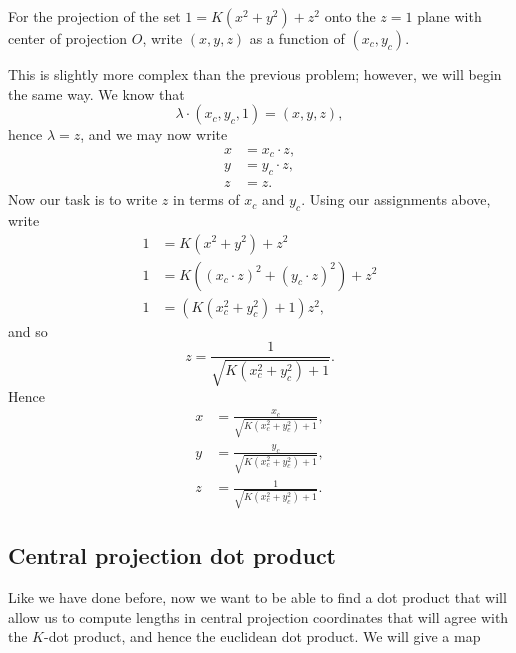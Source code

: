 \documentclass[newpage,hints,handout,12pt,noauthor,nooutcomes]{ximera}
\begin{document}
\begin{problem}
  For the projection of the set $1=K\left(x^{2}+y^{2}\right)+z^{2} $
  onto the $z=1$ plane with center of projection $O$, write $(x,y,z)$
  as a function of $(x_{c},y_{c})$.
  \begin{freeResponse}
    This is slightly more complex than the previous problem; however,
    we will begin the same way. We know that
    \[
    \lambda\cdot(x_{c},y_{c},1)=(x,y,z),
    \]
    hence $\lambda=z$, and we may now write
    \begin{align*}
      x &= x_c\cdot z,\\
      y &= y_c\cdot z,\\
      z &= z.
    \end{align*}
    Now our task is to write $z$ in terms of $x_c$ and $y_c$. Using our assignments above, write
    \begin{align*}
      1 &= K\left(x^2 + y^2\right) + z^2\\
      1 &= K\left((x_c\cdot z)^2 + (y_c\cdot z)^2\right) + z^2\\
      1 &= \left(K\left(x_c^2 + y_c^2\right)+1\right)z^2,
    \end{align*}
    and so
    \[
    z = \frac{1}{\sqrt{K\left(x_c^2 + y_c^2\right)+1}}.
    \]
    Hence
    \begin{align*}
      x &= \frac{x_c}{\sqrt{K\left(x_c^2 + y_c^2\right)+1}},\\
      y &= \frac{y_c}{\sqrt{K\left(x_c^2 + y_c^2\right)+1}},\\
      z &= \frac{1}{\sqrt{K\left(x_c^2 + y_c^2\right)+1}}.
    \end{align*}
  \end{freeResponse}
\end{problem}






\subsection{Central projection dot product}

Like we have done before, now we want to be able to find a dot product
that will allow us to compute lengths in central projection
coordinates that will agree with the $K$-dot product, and hence the
euclidean dot product.  We will give a map
\end{document}
